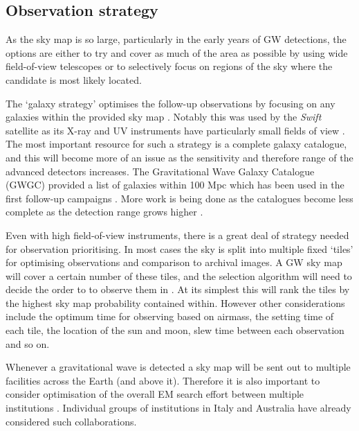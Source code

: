 \begin{colsection}
\begin{colsection}
\end{colsection}


\subsection{Observation strategy}
\label{sec:strategy}
\begin{colsection}

As the sky map is so large, particularly in the early years of GW detections, the options are either to try and cover as much of the area as possible by using wide field-of-view telescopes or to selectively focus on regions of the sky where the candidate is most likely located.

The `galaxy strategy' optimises the follow-up observations by focusing on any galaxies within the provided sky map \citep{LIGO-galaxys}. Notably this was used by the \emph{Swift} satellite as its X-ray and UV instruments have particularly small fields of view \cite{LIGO-firstrun-Swift,GW150914followup-Swift}. The most important resource for such a strategy is a complete galaxy catalogue, and this will become more of an issue as the sensitivity and therefore range of the advanced detectors increases. The Gravitational Wave Galaxy Catalogue (GWGC) provided a list of galaxies within 100 Mpc \citep{LIGO-GWGC} which has been used in the first follow-up campaigns \citep{LIGO-firstrun-Swift,GW150914followup-Swift}. More work is being done as the catalogues become less complete as the detection range grows higher \citep{LIGO-galaxys,LIGO-galaxys2}.

Even with high field-of-view instruments, there is a great deal of strategy needed for observation prioritising. In most cases the sky is split into multiple fixed `tiles' for optimising observations and comparison to archival images. A GW sky map will cover a certain number of these tiles, and the selection algorithm will need to decide the order to to observe them in \citep{LIGO-tiles-dutch, LIGO-tiles-india}. At its simplest this will rank the tiles by the highest sky map probability contained within. However other considerations include the optimum time for observing based on airmass, the setting time of each tile, the location of the sun and moon, slew time between each observation and so on.

Whenever a gravitational wave is detected a sky map will be sent out to multiple facilities across the Earth (and above it). Therefore it is also important to consider optimisation of the overall EM search effort between multiple institutions \citep{LIGO-optimal,LIGO-optimal2}. Individual groups of institutions in Italy \citep{LIGO-italy} and Australia \citep{LIGO-aus} have already considered such collaborations. 

\end{colsection}


\end{colsection}

